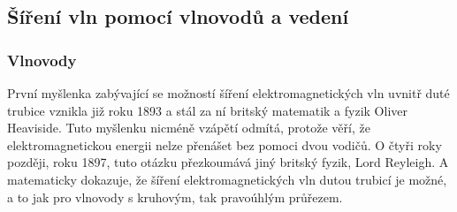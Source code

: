 \documentclass[12pt,a4paper,oneside]{article}
\numberwithin{equation}{section} %
\numberwithin{figure}{section} %
\numberwithin{table}{section} %
\renewcommand{\vec}[1]{\mbox{\boldmath$#1$}} %
\newcommand{\faz}[1]{{\underline{#1}}} %
\begin{document}
%
 
 


\newpage
\subsection{Šíření vln pomocí vlnovodů a vedení}
\subsubsection{Vlnovody}
První myšlenka zabývající se možností šíření elektromagnetických vln uvnitř duté trubice vznikla již roku 1893 a stál za ní britský matematik a fyzik Oliver Heaviside. Tuto myšlenku nicméně vzápětí odmítá, protože věří, že elektromagnetickou energii nelze přenášet bez pomoci dvou vodičů. O čtyři roky později, roku 1897, tuto otázku přezkoumává jiný britský fyzik, Lord Reyleigh. A matematicky dokazuje, že šíření elektromagnetických vln dutou trubicí je možné, a to jak pro vlnovody s kruhovým, tak pravoúhlým průřezem. \cite{Pozar2}
\end{document}
